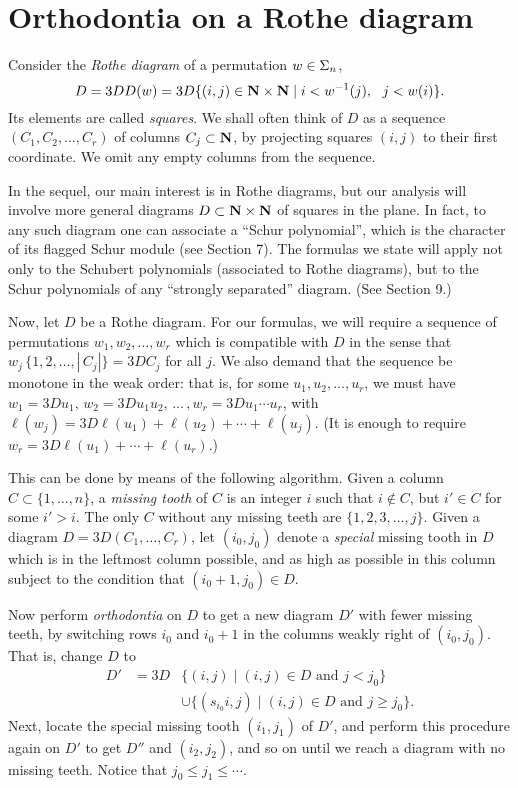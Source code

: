 \section{Orthodontia on a Rothe diagram}

Consider the {\em Rothe diagram}
of a permutation $w \in {\Sigma}_n$,
$$
D =3D D(w) =3D\{(i,j) \in {\bf N} \times {\bf N}
\mid i < w^{-1}(j), \ \ j < w(i)\}.
$$
Its elements are called {\em squares}.
We shall often think of $D$ as a sequence
$(C_1,C_2,\ldots,C_r)$ of columns $C_j \subset {\bf N}$,
by projecting squares $(i,j)$ to their first coordinate.
We omit any empty columns from the sequence.

In the sequel, our main interest is in Rothe
diagrams, but our analysis will involve more
general diagrams $D \subset {\bf N} \times {\bf N}$
of squares in the plane.  In fact, to any such diagram
one can associate a ``Schur polynomial'', which is the character
of its flagged Schur module (see Section 7).
The formulas we state will apply not only to
the Schubert polynomials (associated to Rothe diagrams),
but to the Schur polynomials of any ``strongly separated''
diagram.  (See Section 9.)

Now, let $D$ be a Rothe diagram.
For our formulas, we will require a sequence of permutations
$w_1, w_2, \ldots, w_r$ which is compatible
with $D$ in the sense that
$w_j\, \{1,2,\ldots, |\,C_j|\} =3D C_j$ for all $j$.
We also demand that the sequence be
monotone in the weak order:
that is, for some $u_1, u_2, \ldots , u_r$,
we must have $w_1 =3D u_1,\, w_2 =3D u_1 u_2,\, \ldots\, ,
w_r =3D u_1 \cdots u_r$,
with $\ell(w_j) =3D \ell(u_1) + \ell(u_2) + \cdots + \ell(u_j)$.
(It is enough to require $w_r =3D \ell(u_1) + \cdots + \ell(u_r)$.)

This can be done by means of the following algorithm.
Given a column $C \subset \{1,\ldots,n\}$, a
{\em missing tooth} of $C$ is an integer $i$ such
that $i \not\in C$, but $i' \in C$ for some $i' > i$.
The only $C$ without any missing teeth are
$\{1,2,3,\ldots,j\}$.  Given a diagram $D =3D (C_1, \ldots, C_r)$,
let $(i_0,j_0)$ denote a {\em special} missing tooth in $D$ which is
in the leftmost column possible, and as high as possible in this column
subject to the condition that $(i_0+1,j_0) \in D$.

Now perform {\em orthodontia} on $D$ to get a new
diagram $D'$ with fewer missing teeth,
by switching rows $i_0$ and $i_0+1$ in the columns weakly
right of $(i_0,j_0)$.
That is, change $D$ to
$$
\begin{array}{rcl}
D' & =3D & \{ (i,j) \mid (i,j) \in D \mbox{ and } j < j_0 \} \\
& & \cup \{ (s_{i_0}i,j) \mid (i,j) \in D \mbox{ and } j \geq j_0 \} .
\end{array}
$$
Next, locate the special missing tooth $(i_1,j_1)$ of
$D'$, and perform this procedure again on $D'$ to
get $D''$ and $(i_2,j_2)$, and so on until we reach a diagram
with no missing teeth.  Notice that $j_0 \leq j_1 \leq \cdots $.

